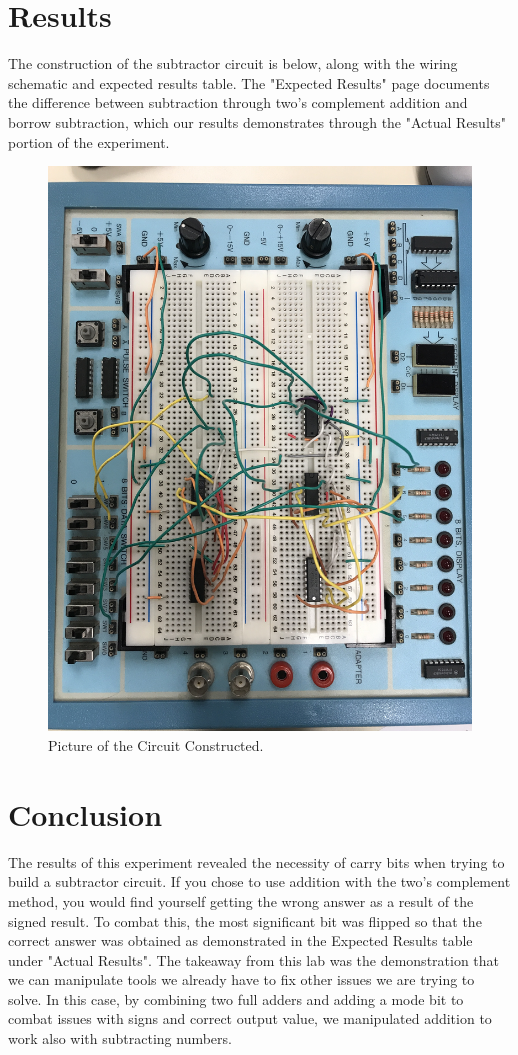 \documentclass[11pt]{article}
\begin{document}
\section*{Results}

The construction of the subtractor circuit is below, along with the wiring schematic and expected results table. The "Expected Results" page documents the difference between subtraction through two's complement addition and borrow subtraction, which our results demonstrates through the "Actual Results" portion of the experiment.
\clearpage
\begin{figure}
	\includegraphics[width=1.0\textwidth]{"Circuit Picture"}
	\caption{Picture of the Circuit Constructed.}
\end{figure}


\section*{Conclusion}
The results of this experiment revealed the necessity of carry bits when trying to build a subtractor circuit. If you chose to use addition with the two's complement method, you would find yourself getting the wrong answer as a result of the signed result. To combat this, the most significant bit was flipped so that the correct answer was obtained as demonstrated in the Expected Results table under "Actual Results". The takeaway from this lab was the demonstration that we can manipulate tools we already have to fix other issues we are trying to solve. In this case, by combining two full adders and adding a mode bit to combat issues with signs and correct output value, we manipulated addition to work also with subtracting numbers.
\end{document}
